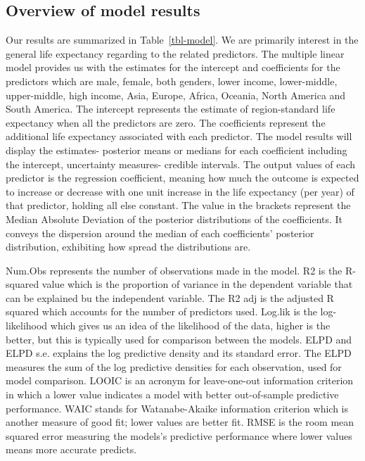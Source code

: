 \documentclass[
  letterpaper,
  DIV=11,
  numbers=noendperiod]{scrartcl}
\begin{document}
\subsection{Overview of model results}\label{overview-of-model-results}

Our results are summarized in Table~\ref{tbl-model}. We are primarily
interest in the general life expectancy regarding to the related
predictors. The multiple linear model provides us with the estimates for
the intercept and coefficients for the predictors which are male,
female, both genders, lower income, lower-middle, upper-middle, high
income, Asia, Europe, Africa, Oceania, North America and South America.
The intercept represents the estimate of region-standard life expectancy
when all the predictors are zero. The coefficients represent the
additional life expectancy associated with each predictor. The model
results will display the estimates- posterior means or medians for each
coefficient including the intercept, uncertainty measures- credible
intervals. The output values of each predictor is the regression
coefficient, meaning how much the outcome is expected to increase or
decrease with one unit increase in the life expectancy (per year) of
that predictor, holding all else constant. The value in the brackets
represent the Median Absolute Deviation of the posterior distributions
of the coefficients. It conveys the dispersion around the median of each
coefficients' posterior distribution, exhibiting how spread the
distributions are.

Num.Obs represents the number of observations made in the model. R2 is
the R-squared value which is the proportion of variance in the dependent
variable that can be explained bu the independent variable. The R2 adj
is the adjusted R squared which accounts for the number of predictors
used. Log.lik is the log-likelihood which gives us an idea of the
likelihood of the data, higher is the better, but this is typically used
for comparison between the models. ELPD and ELPD s.e. explains the log
predictive density and its standard error. The ELPD measures the sum of
the log predictive densities for each observation, used for model
comparison. LOOIC is an acronym for leave-one-out information criterion
in which a lower value indicates a model with better out-of-sample
predictive performance. WAIC stands for Watanabe-Akaike information
criterion which is another measure of good fit; lower values are better
fit. RMSE is the room mean squared error measuring the models's
predictive performance where lower values means more accurate predicts.
\end{document}
